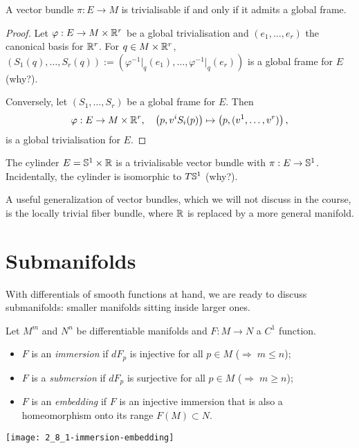 \begin{proposition}\label{prop:trivialisable}
  A vector bundle $\pi: E\to M$ is trivialisable if and only if it admits a global frame.
\end{proposition}
\begin{proof}
  Let $\varphi: E \to M\times\mathbb{R}^r$ be a global trivialisation and $(e_1, \ldots, e_r)$ the canonical basis for $\mathbb{R}^r$.
  For $q\in M\times\mathbb{R}^r$, $(S_1(q), \ldots, S_r(q)) := \left(\varphi^{-1}\big|_q(e_1), \ldots, \varphi^{-1}\big|_q(e_r) \right)$ is a global frame for $E$ (why?).

  Conversely, let $(S_1, \ldots, S_r)$ be a global frame for $E$. Then
  \begin{equation}
    \varphi: E \to M\times\mathbb{R}^r, \quad
    \left(p, v^i S_i(p)\right) \mapsto \left(p, (v^1, \ldots, v^r)\right),
  \end{equation}
  is a global trivialisation for $E$.
\end{proof}

\begin{example}
  The cylinder $E = \mathbb{S}^1\times\mathbb{R}$ is a trivialisable vector bundle with $\pi:E\to \mathbb{S}^1$.
  Incidentally, the cylinder is isomorphic to $T\mathbb{S}^1$ (why?).
\end{example}

A useful generalization of vector bundles, which we will not discuss in the course, is the locally trivial fiber bundle, where $\mathbb{R}$ is replaced by a more general manifold.

\section{Submanifolds}

With differentials of smooth functions at hand, we are ready to discuss submanifolds: smaller manifolds sitting inside larger ones.

\begin{definition}
  Let $M^m$ and $N^n$ be differentiable manifolds and $F:M\to N$ a $C^1$ function.
  \begin{itemize}
    \item $F$ is an \emph{immersion} if $dF_p$ is injective for all $p\in M$ ($\Rightarrow\; m\leq n$);
    \item $F$ is a \emph{submersion} if $dF_p$ is surjective for all $p\in M$ ($\Rightarrow\; m\geq n$);
    \item $F$ is an \emph{embedding} if $F$ is an injective immersion that is also a homeomorphism onto its range $F(M)\subset N$.
  \end{itemize}
\end{definition}
\begin{marginfigure}
  \texttt{[image: 2\_8\_1-immersion-embedding]}
\end{marginfigure}

